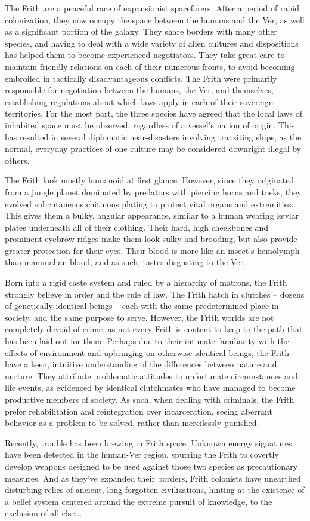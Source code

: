 \documentclass[blue]{guildcamp4}
\begin{document}
\name{\bFrith{}}

The Frith are a peaceful race of expansionist spacefarers. After a period of rapid colonization, they now occupy the space between the humans and the Ver, as well as a significant portion of the galaxy. They share borders with many other species, and having to deal with a wide variety of alien cultures and dispositions has helped them to become experienced negotiators. They take great care to maintain friendly relations on each of their numerous fronts, to avoid becoming embroiled in tactically disadvantageous conflicts. The Frith were primarily responsible for negotiation between the humans, the Ver, and themselves, establishing regulations about which laws apply in each of their sovereign territories. For the most part, the three species have agreed that the local laws of inhabited space must be observed, regardless of a vessel's nation of origin. This has resulted in several diplomatic near-disasters involving transiting ships, as the normal, everyday practices of one culture may be considered downright illegal by others.
	
The Frith look mostly humanoid at first glance. However, since they originated from a jungle planet dominated by predators with piercing horns and tusks, they evolved subcutaneous chitinous plating to protect vital organs and extremities. This gives them a bulky, angular appearance, similar to a human wearing kevlar plates underneath all of their clothing. Their hard, high cheekbones and prominent eyebrow ridges make them look sulky and brooding, but also provide greater protection for their eyes. Their blood is more like an insect's hemolymph than mammalian blood, and as such, tastes disgusting to the Ver.

Born into a rigid caste system and ruled by a hierarchy of matrons, the Frith strongly believe in order and the rule of law. The Frith hatch in clutches -- dozens of genetically identical beings -- each with the same predetermined place in society, and the same purpose to serve. However, the Frith worlds are not completely devoid of crime, as not every Frith is content to keep to the path that has been laid out for them. Perhaps due to their intimate familiarity with the effects of environment and upbringing on otherwise identical beings, the Frith have a keen, intuitive understanding of the differences between nature and nurture. They attribute problematic attitudes to unfortunate circumstances and life events, as evidenced by identical clutchmates who have managed to become productive members of society. As such, when dealing with criminals, the Frith prefer rehabilitation and reintegration over incarceration, seeing aberrant behavior as a problem to be solved, rather than mercilessly punished. 

Recently, trouble has been brewing in Frith space. Unknown energy signatures have been detected in the human-Ver region, spurring the Frith to covertly develop weapons designed to be used against those two species as precautionary measures. And as they've expanded their borders, Frith colonists have unearthed disturbing relics of ancient, long-forgotten civilizations, hinting at the existence of a belief system centered around the extreme pursuit of knowledge, to the exclusion of all else...
	
\end{document}
